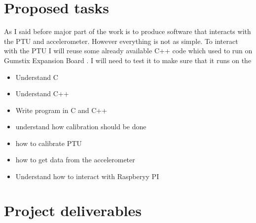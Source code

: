 \documentclass[11pt,fleqn,twoside]{article}
\begin{document}
\section{Proposed tasks}
As I said before major part of the work is to produce software that interacts with the PTU and accelerometer. However everything is not as simple. To interact with the PTU I will reuse some already available C++ code which used to run on Gumstix Expansion Board \cite{gumstix_com}. I will need to test it to make sure that it runs on the   

\begin{itemize} \itemsep1pt \parskip0pt 
\item Understand C
\item Understand C++
\item Write program in C and C++
\item understand how calibration should be done
\item how to calibrate PTU
\item how to get data from the accelerometer
\item Understand how to interact with Raspberyy  PI
\end{itemize}

\section{Project deliverables}
\end{document}
